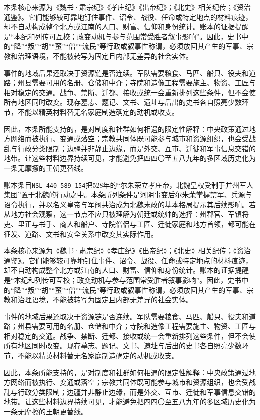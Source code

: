 本条核心来源为《魏书·肃宗纪》《孝庄纪》《出帝纪》；《北史》相关纪传；《资治通鉴》。它们能够较可靠地钉住事件、诏令、战役、任命或特定地点的材料痕迹，却不自动构成整个北方或江南的人口、财富、信仰和身份统计。账本的证据提醒是“本纪和列传可互校；政变动机与参与范围常受胜者叙事影响”。因此，史书中的“降”“叛”“胡”“蛮”“僧”“流民”等行政或叙事性称谓，必须放回其产生的军事、宗教和治理语境，不能被转写为固定且内部无差异的社会实体。

事件的地域后果还取决于资源链是否连续。军队需要粮食、马匹、船只、役夫和道路；州县需要可用的名册、仓储和中介；寺院和造像工程需要施主、物资、工匠与相对稳定的交通。战争、禁断、迁都、接收或统一会重新排列这些条件，但不会使所有地区同时改变。现存墓志、题记、文书、遗址与后出的史书各自照亮少数环节，不能以精英材料替无名家庭制造确定的动机或收支。

因此，本条所能支持的，是对制度和社群如何相遇的限定性解释：中央政策通过地方网络而被执行、变通或落空；宗教共同体既可能参与城市和资源组织，也会受战乱与行政分类限制；边疆并非静止边缘，而是外交、互市、迁徙和军事信息交错的地带。让这些材料边界持续可见，才能避免把四四〇至五八九年的多区域历史化为一条无摩擦的王朝更替线。

账本条目\texttt{NSL-440-589-154}把528年的“尔朱荣立孝庄帝，北魏皇权受制于并州军人集团”置于北魏的行动之中。本条所列条件是河阴事变后尔朱荣掌握禁军、兵源与诏令执行，并以名义皇帝与军阀共治成为北魏末政的基本格局提示其后续影响。若从地方社会观察，这一节点不应只被理解为朝廷或统帅的选择：州郡官、军镇将吏、里正与书手、商人和船户、寺院僧侣与工匠、迁徙家庭和地方首领，都可能在征发、道路、文书和安全关系中改变其实际作用。

本条核心来源为《魏书·肃宗纪》《孝庄纪》《出帝纪》；《北史》相关纪传；《资治通鉴》。它们能够较可靠地钉住事件、诏令、战役、任命或特定地点的材料痕迹，却不自动构成整个北方或江南的人口、财富、信仰和身份统计。账本的证据提醒是“本纪和列传可互校；政变动机与参与范围常受胜者叙事影响”。因此，史书中的“降”“叛”“胡”“蛮”“僧”“流民”等行政或叙事性称谓，必须放回其产生的军事、宗教和治理语境，不能被转写为固定且内部无差异的社会实体。

事件的地域后果还取决于资源链是否连续。军队需要粮食、马匹、船只、役夫和道路；州县需要可用的名册、仓储和中介；寺院和造像工程需要施主、物资、工匠与相对稳定的交通。战争、禁断、迁都、接收或统一会重新排列这些条件，但不会使所有地区同时改变。现存墓志、题记、文书、遗址与后出的史书各自照亮少数环节，不能以精英材料替无名家庭制造确定的动机或收支。

因此，本条所能支持的，是对制度和社群如何相遇的限定性解释：中央政策通过地方网络而被执行、变通或落空；宗教共同体既可能参与城市和资源组织，也会受战乱与行政分类限制；边疆并非静止边缘，而是外交、互市、迁徙和军事信息交错的地带。让这些材料边界持续可见，才能避免把四四〇至五八九年的多区域历史化为一条无摩擦的王朝更替线。

